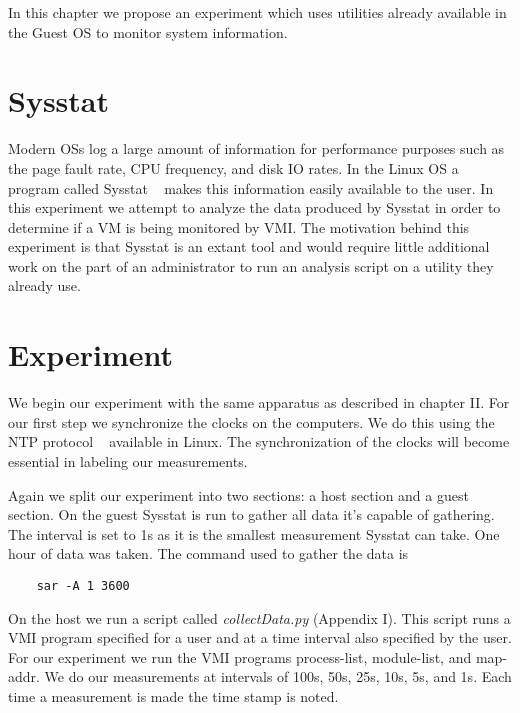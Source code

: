 
In this chapter we propose an experiment which uses utilities already available in the
Guest OS to monitor system information. 

\section{Sysstat}

Modern OSs log a large amount of information for performance purposes such as the page fault rate, CPU frequency, and disk IO rates. In the Linux OS a program called Sysstat ~\cite{godard_sysstat_2010} makes this information easily available to the user. In this experiment we attempt to analyze the data produced by Sysstat in order to determine if a VM is being monitored by VMI. The motivation behind this experiment is that Sysstat is an extant tool and would require little additional work on the part of an administrator to run an analysis script on a utility they already use. 

\section{Experiment}

We begin our experiment with the same apparatus as described in chapter II. For our first step we synchronize the clocks on the computers. We do this using the NTP protocol ~\cite{mills_internet_1991} available in Linux. The synchronization of the clocks will become essential in labeling our measurements.

Again we split our experiment into two sections: a host section and a guest section. On the guest Sysstat is run to gather all data it's capable of gathering. The interval is set to 1s as it is the smallest measurement Sysstat can take. One hour of data was taken. The command used to gather the data is 

\begin{center}\label{SAR}
\begin{verbatim}
	sar -A 1 3600
\end{verbatim}
\end{center}

On the host we run a script called \textit{collectData.py} (Appendix I). This script runs a VMI program specified for a user and at a time interval also specified by the user. For our experiment we run the VMI programs process-list, module-list, and map-addr. We do our measurements at intervals of 100s, 50s, 25s, 10s, 5s, and 1s. Each time a measurement is made the time stamp is noted.

